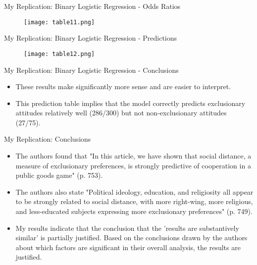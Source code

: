\documentclass{beamer}
\begin{document}
\begin{frame}{My Replication: Binary Logistic Regression - Odds Ratios}
	\vspace{-1.4cm}
	\begin{figure}[htbp]
		\centering
		\texttt{[image: table11.png]} %
		\label{fig:intercepts}
	\end{figure}
\end{frame}

\begin{frame}{My Replication: Binary Logistic Regression - Predictions}
	\vspace{-1.4cm}
	\begin{figure}[htbp]
		\centering
		\texttt{[image: table12.png]} %
		\label{fig:intercepts}
	\end{figure}
\end{frame}


\begin{frame}{My Replication: Binary Logistic Regression - Conclusions}
	\begin{itemize}
		\item These results make significantly more sense and are easier to interpret. 
		\item This prediction table implies that the model correctly predicts exclusionary attitudes relatively well (286/300) but not non-exclusionary attitudes (27/75).
	\end{itemize}
\end{frame}



\begin{frame}{My Replication: Conclusions}
	
	\begin{itemize}
		\item The authors found that "In this article, we have shown that social distance, a measure of exclusionary preferences, is strongly predictive of cooperation in a public goods game" (p. 753).
		\item The authors also state "Political ideology, education, and religiosity all appear to be strongly related to social distance, with more right-wing, more religious, and less-educated subjects expressing more exclusionary preferences" (p. 749).
		\item My results indicate that the conclusion that the 'results are substantively similar' is partially justified. Based on the conclusions drawn by the authors about which factors are significant in their overall analysis, the results are justified. 
	\end{itemize}
\end{frame}
\end{document}
